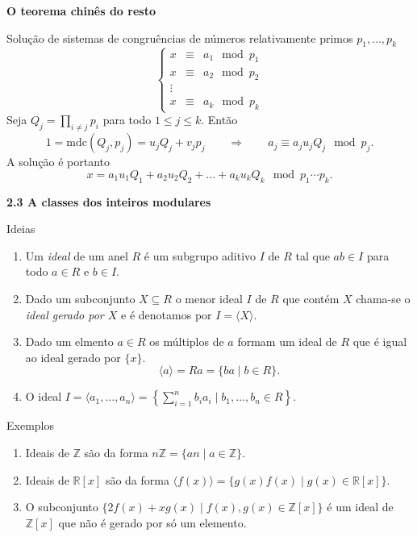 \documentclass{beamer}
\newcommand{\ZZ}{\mathbb Z}
\newcommand{\RR}{\mathbb R}
\newcommand{\mdc}[2]{\mathrm{mdc}({#1}, {#2})}
\begin{document}
\begin{frame}{\bf O teorema chinês do resto}

Solução de sistemas de congruências de números relativamente primos $p_1, \ldots, p_k$
$$\left\{ \begin{array}{rcl} x &\equiv& a_1 \mod p_1 \\ x &\equiv& a_2 \mod p_2 \\ \vdots &&\\
x &\equiv& a_k \mod p_k\end{array}\right.$$
Seja $Q_j = \prod_{i\neq j} p_i$ para todo $1\leq j\leq k$. Então 
$$1=\mdc{Q_j}{p_j} = u_jQ_j + v_jp_j \qquad \Rightarrow \qquad  a_j \equiv a_ju_j Q_j \mod p_j.$$
A solução é portanto
$$ x = a_1u_1Q_1 + a_2u_2Q_2 + \ldots + a_ku_kQ_k \mod p_1\cdots p_k.$$


\end{frame}


\begin{frame}{\bf 2.3 A classes dos inteiros modulares}
\begin{block}{Ideias} 
\begin{enumerate}
\item Um {\it ideal} de um anel $R$ é um subgrupo aditivo $I$ de $R$ tal que $ab \in I$ para todo $a\in R$ e $b\in I$.
\item Dado um subconjunto $X\subseteq R$ o menor ideal $I$ de $R$ que contém $X$ chama-se o {\it ideal gerado por $X$} e é denotamos por $I=\langle X \rangle$.\pause
\item Dado um elmento $a\in R$ os múltiplos de $a$ formam um ideal de $R$ que é igual ao ideal gerado por $\{x\}$.
$$ \langle a \rangle = Ra = \{ ba  \mid b \in R\}.$$\pause
\item O ideal  $I=\langle a_1, \ldots, a_n\rangle =\left\{ \sum_{i=1}^n b_ia_i \mid b_1, \ldots, b_n \in R\right\}.$
\end{enumerate}
\end{block}
\end{frame}
 
 \begin{frame}
 \begin{block}{Exemplos}
 \begin{enumerate}
  \item Ideais de $\ZZ$ são da forma $n\ZZ  = \{ an \mid a \in \ZZ\}$.\pause
    \item Ideais de $\RR[x]$ são da forma $ \langle f(x) \rangle = \{g(x)f(x) \mid g(x)\in \RR[x]\}$.\pause
  \item O subconjunto $\{2f(x) + xg(x) \mid f(x),g(x) \in \ZZ[x]\}$ é um ideal de $\ZZ[x]$ que não é gerado por só um elemento.
 \end{enumerate}
 \end{block}
 \end{frame}
 
\end{document}
